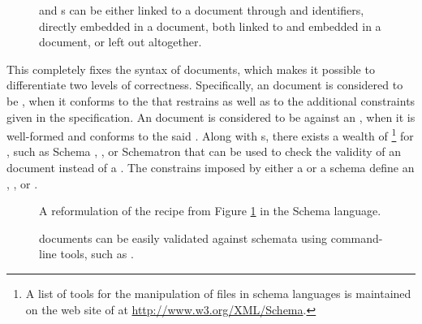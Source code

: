 \documentclass[
  a5paper,10pt,           %
  dvipsnames              %
]{book}
\begin{document}
\begin{figure}
  \caption{ and  s can be either linked
    to a document through  and  identifiers,
    directly embedded in a document, both linked to and embedded in a document,
    or left out altogether.}
  \label{fig:recipe-dtd}
\end{figure}
        
This  completely fixes the syntax of  documents, which
makes it possible to differentiate two levels of correctness. Specifically, an
 document is considered to be %
, when it conforms to the 
 that restrains  as well as to the additional
constraints given in the specification. An  document is
considered to be   against an
 , when it is well-formed and conforms to the said
 .  Along with s, there exists a wealth
of \footnote{
  A list of tools for the manipulation of files in  schema
  languages is maintained on the web site of  at
  \url{http://www.w3.org/XML/Schema}.
} for , such as   Schema%
, , or Schematron that can be used to
check the validity of an  document instead of a .
The constrains imposed by either a  or a schema define an
, , or .
 

\begin{figure}
  \caption{A reformulation of the recipe  from Figure
    \ref{fig:recipe-dtd} in the  Schema 
    language.}
  \label{fig:recipe-xsd}
\end{figure}

\begin{figure}
  \caption{ documents can be easily validated against 
    schemata using command-line tools, such as .}
\end{figure}
\end{document}
